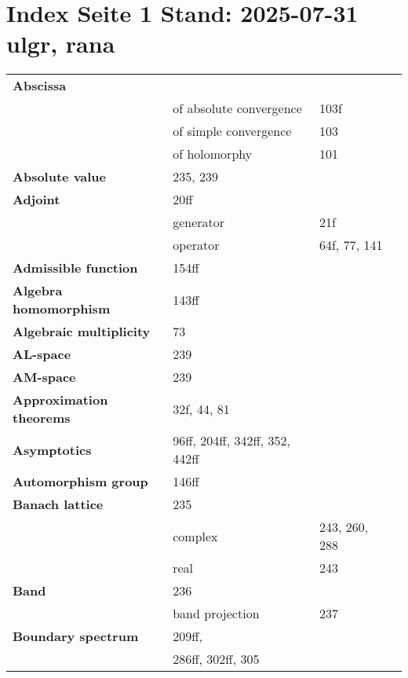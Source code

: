 \documentclass[10pt]{scrartcl}
\begin{document}
\pagestyle{empty}
\section*{Index Seite 1 Stand: 2025-07-31 ulgr, rana}
\begin{longtable}{>{\bfseries}p{5cm}p{4cm}p{4cm}p{4cm}}
Abscissa 	& \\
	& of absolute convergence 	& 103f \\
	& of simple convergence 	& 103 \\
	& of holomorphy 	& 101 \\
Absolute value 	& 235, 239 \\
Adjoint 	& 20ff\\
	& generator 	& 21f \\
	& operator 	& 64f, 77, 141 \\
Admissible function 	& 154ff \\
Algebra homomorphism 	& 143ff \\
Algebraic multiplicity 	& 73 \\
AL-space 	& 239 \\
AM-space 	& 239 \\
Approximation theorems 	& 32f, 44, 81\\
Asymptotics 	& 96ff, 204ff, 342ff, 352, 442ff \\
Automorphism group 	& 146ff \\

Banach lattice 	& 235 \\
	& complex 	& 243, 260, 288 \\
	& real 	& 243 \\
Band 	& 236 \\
	& band projection 	& 237 \\
Boundary spectrum 	& 209ff, \\
	& 286ff, 302ff, 305 \\


\end{longtable}
\end{document}
